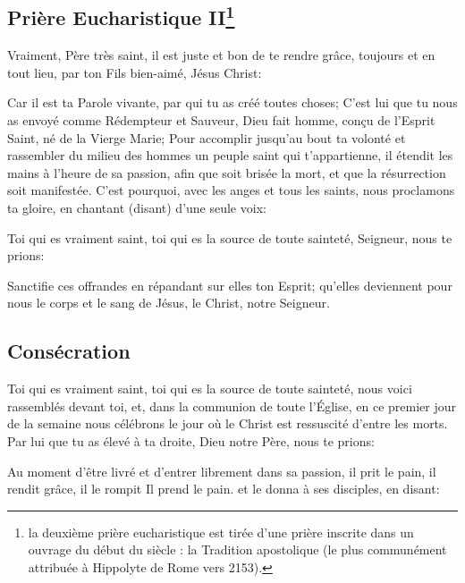 
\subsection*{Prière Eucharistique II\footnote{la deuxième prière eucharistique est tirée d’une prière inscrite 
dans un ouvrage du début du  siècle : la Tradition apostolique 
(le plus communément attribuée à Hippolyte de Rome vers 2153).}}\label{pe2}

Vraiment, Père très saint,
il est juste et bon de te rendre grâce,
toujours et en tout lieu,
par ton Fils bien-aimé, Jésus Christ:

Car il est ta Parole vivante,
par qui tu as créé toutes choses;
C'est lui que tu nous as envoyé
comme Rédempteur et Sauveur,
Dieu fait homme, conçu de l'Esprit Saint,
né de la Vierge Marie;
Pour accomplir jusqu'au bout ta volonté
et rassembler du milieu des hommes
un peuple saint qui t'appartienne,
il étendit les mains à l'heure de sa passion,
afin que soit brisée la mort,
et que la résurrection soit manifestée.
C'est pourquoi,
avec les anges et tous les saints,
nous proclamons ta gloire,
en chantant (disant) d'une seule voix:




Toi qui es vraiment saint,
toi qui es la source de toute sainteté,
Seigneur, nous te prions:


Sanctifie ces offrandes
en répandant sur elles ton Esprit; 
qu'elles deviennent pour nous 
le corps et le sang de Jésus, le Christ, notre Seigneur.

\subsection*{Consécration}

Toi qui es vraiment saint,
toi qui es la source de toute sainteté,
nous voici rassemblés devant toi,
et, dans la communion de toute l'Église,
en ce premier jour de la semaine
nous célébrons le jour
où le Christ est ressuscité d'entre les morts.
Par lui que tu as élevé à ta droite,
Dieu notre Père, nous te prions:

Au moment d'être livré
et d'entrer librement dans sa passion,
il prit le pain, il rendit grâce, il le rompit Il prend le pain.
et le donna à ses disciples, en disant:

